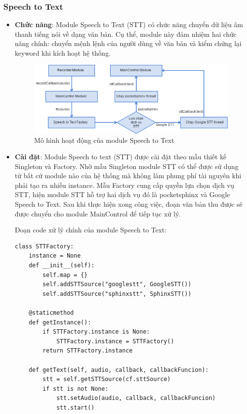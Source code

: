\subsubsection{Speech to Text}
\begin{itemize}
\item \textbf{Chức năng}: Module Speech to Text (STT) có chức năng chuyển dữ liệu âm thanh tiếng nói về dạng văn bản. Cụ thể, module này đảm nhiệm hai chức năng chính: chuyển mệnh lệnh của người dùng về văn bản và kiểm chứng lại keyword khi kích hoạt hệ thống.

\begin{figure}[h]
    \centering
    \includegraphics[scale=0.5]{stt_flowchart}
    \caption{Mô hình hoạt động của module Speech to Text}
    \label{fig:c6_stt_flowchart}
\end{figure}

\item \textbf{Cài đặt}: Module Speech to text (STT) được cài đặt theo mẫu thiết kế Singleton và Factory. Nhờ mẫu Singleton module STT có thể được sử dụng từ bất cứ module nào của hệ thống mà không làm phung phí tài nguyên khi phải tạo ra nhiều instance. Mẫu Factory cung cấp quyền lựa chọn dịch vụ STT, hiện module STT hỗ trợ hai dịch vụ đó là pocketsphinx và Google Speech to Text. Sau khi thực hiện xong công việc, đoạn văn bản thu được sẽ được chuyển cho module MainControl để tiếp tục xử lý.

Đoạn code xử lý chính của module Speech to Text:
\begin{lstlisting}
class STTFactory:
    instance = None
    def __init__(self):
        self.map = {}
        self.addSTTSource("googlestt", GoogleSTT())
        self.addSTTSource("sphinxstt", SphinxSTT())
        
    @staticmethod
    def getInstance():
        if STTFactory.instance is None:
            STTFactory.instance = STTFactory()
        return STTFactory.instance
    
    def getText(self, audio, callback, callbackFuncion):
        stt = self.getSTTSource(cf.sttSource)
        if stt is not None:
            stt.setAudio(audio, callback, callbackFuncion)
            stt.start()


\end{lstlisting}
\end{itemize}
